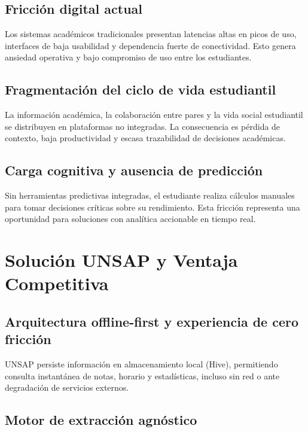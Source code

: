 \documentclass[10.5pt,a4paper]{article}
\begin{document}
\subsection{Fricción digital actual}

Los sistemas académicos tradicionales presentan latencias altas en picos de uso, interfaces de baja usabilidad y dependencia fuerte de conectividad. Esto genera ansiedad operativa y bajo compromiso de uso entre los estudiantes.

\subsection{Fragmentación del ciclo de vida estudiantil}

La información académica, la colaboración entre pares y la vida social estudiantil se distribuyen en plataformas no integradas. La consecuencia es pérdida de contexto, baja productividad y escasa trazabilidad de decisiones académicas.

\subsection{Carga cognitiva y ausencia de predicción}

Sin herramientas predictivas integradas, el estudiante realiza cálculos manuales para tomar decisiones críticas sobre su rendimiento. Esta fricción representa una oportunidad para soluciones con analítica accionable en tiempo real.


\section{Solución UNSAP y Ventaja Competitiva}

\subsection{Arquitectura offline-first y experiencia de cero fricción}

UNSAP persiste información en almacenamiento local (Hive), permitiendo consulta instantánea de notas, horario y estadísticas, incluso sin red o ante degradación de servicios externos.

\subsection{Motor de extracción agnóstico}
\end{document}
